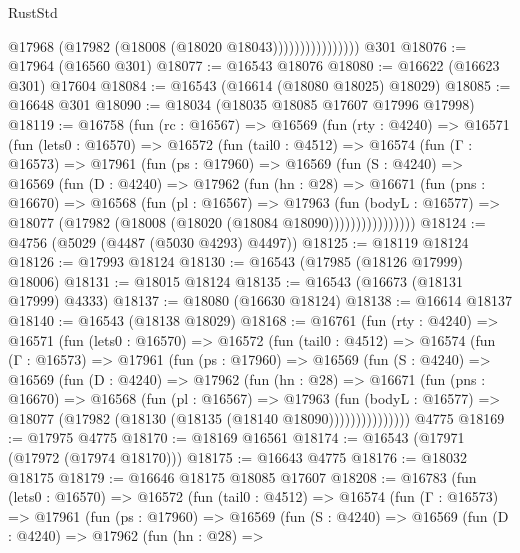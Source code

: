 \begin{lexlean}{RustStd}
\begin{coremodule}
                            @17968 (@17982 (@18008 (@18020 @18043))))))))))))))))
    @301
@18076 := @17964 (@16560 @301)
@18077 := @16543 @18076
@18080 := @16622 (@16623 @301) @17604
@18084 := @16543 (@16614 (@18080 @18025) @18029)
@18085 := @16648 @301
@18090 := @18034 (@18035 @18085 @17607 @17996 @17998)
@18119 := @16758
    (fun (rc : @16567) =>
    @16569
      (fun (rty : @4240) =>
      @16571
        (fun (lets0 : @16570) =>
        @16572
          (fun (tail0 : @4512) =>
          @16574
            (fun (Γ : @16573) =>
            @17961
              (fun (ps : @17960) =>
              @16569
                (fun (S : @4240) =>
                @16569
                  (fun (D : @4240) =>
                  @17962
                    (fun (hn : @28) =>
                    @16671
                      (fun (pns : @16670) =>
                      @16568
                        (fun (pl : @16567) =>
                        @17963
                          (fun (bodyL : @16577) =>
                          @18077 (@17982 (@18008 (@18020 (@18084 @18090))))))))))))))))
@18124 := @4756 (@5029 (@4487 (@5030 @4293) @4497))
@18125 := @18119 @18124
@18126 := @17993 @18124
@18130 := @16543 (@17985 (@18126 @17999) @18006)
@18131 := @18015 @18124
@18135 := @16543 (@16673 (@18131 @17999) @4333)
@18137 := @18080 (@16630 @18124)
@18138 := @16614 @18137
@18140 := @16543 (@18138 @18029)
@18168 := @16761
    (fun (rty : @4240) =>
    @16571
      (fun (lets0 : @16570) =>
      @16572
        (fun (tail0 : @4512) =>
        @16574
          (fun (Γ : @16573) =>
          @17961
            (fun (ps : @17960) =>
            @16569
              (fun (S : @4240) =>
              @16569
                (fun (D : @4240) =>
                @17962
                  (fun (hn : @28) =>
                  @16671
                    (fun (pns : @16670) =>
                    @16568
                      (fun (pl : @16567) =>
                      @17963
                        (fun (bodyL : @16577) =>
                        @18077 (@17982 (@18130 (@18135 (@18140 @18090)))))))))))))))
    @4775
@18169 := @17975 @4775
@18170 := @18169 @16561
@18174 := @16543 (@17971 (@17972 (@17974 @18170)))
@18175 := @16643 @4775
@18176 := @18032 @18175
@18179 := @16646 @18175 @18085 @17607
@18208 := @16783
    (fun (lets0 : @16570) =>
    @16572
      (fun (tail0 : @4512) =>
      @16574
        (fun (Γ : @16573) =>
        @17961
          (fun (ps : @17960) =>
          @16569
            (fun (S : @4240) =>
            @16569
              (fun (D : @4240) =>
              @17962
                (fun (hn : @28) =>

\end{coremodule}
\end{lexlean}
